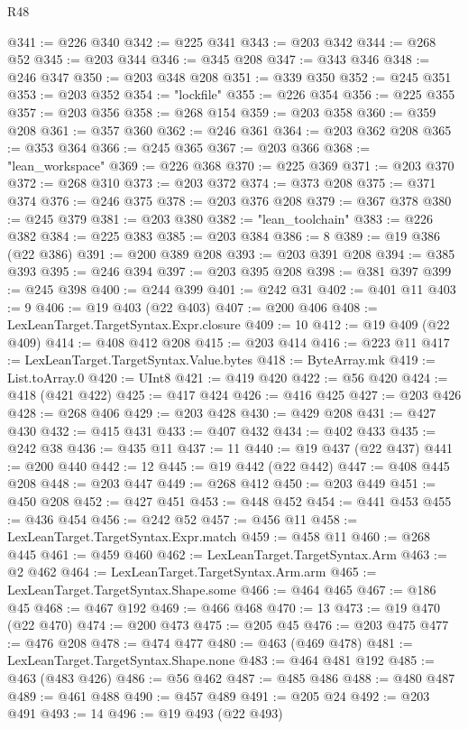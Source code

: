 \begin{lexlean}{R48}
\begin{coremodule}
@341 := @226 @340
@342 := @225 @341
@343 := @203 @342
@344 := @268 @52
@345 := @203 @344
@346 := @345 @208
@347 := @343 @346
@348 := @246 @347
@350 := @203 @348 @208
@351 := @339 @350
@352 := @245 @351
@353 := @203 @352
@354 := "lockfile"
@355 := @226 @354
@356 := @225 @355
@357 := @203 @356
@358 := @268 @154
@359 := @203 @358
@360 := @359 @208
@361 := @357 @360
@362 := @246 @361
@364 := @203 @362 @208
@365 := @353 @364
@366 := @245 @365
@367 := @203 @366
@368 := "lean_workspace"
@369 := @226 @368
@370 := @225 @369
@371 := @203 @370
@372 := @268 @310
@373 := @203 @372
@374 := @373 @208
@375 := @371 @374
@376 := @246 @375
@378 := @203 @376 @208
@379 := @367 @378
@380 := @245 @379
@381 := @203 @380
@382 := "lean_toolchain"
@383 := @226 @382
@384 := @225 @383
@385 := @203 @384
@386 := 8
@389 := @19 @386 (@22 @386)
@391 := @200 @389 @208
@393 := @203 @391 @208
@394 := @385 @393
@395 := @246 @394
@397 := @203 @395 @208
@398 := @381 @397
@399 := @245 @398
@400 := @244 @399
@401 := @242 @31
@402 := @401 @11
@403 := 9
@406 := @19 @403 (@22 @403)
@407 := @200 @406
@408 := LexLeanTarget.TargetSyntax.Expr.closure
@409 := 10
@412 := @19 @409 (@22 @409)
@414 := @408 @412 @208
@415 := @203 @414
@416 := @223 @11
@417 := LexLeanTarget.TargetSyntax.Value.bytes
@418 := ByteArray.mk
@419 := List.toArray.{0}
@420 := UInt8
@421 := @419 @420
@422 := @56 @420
@424 := @418 (@421 @422)
@425 := @417 @424
@426 := @416 @425
@427 := @203 @426
@428 := @268 @406
@429 := @203 @428
@430 := @429 @208
@431 := @427 @430
@432 := @415 @431
@433 := @407 @432
@434 := @402 @433
@435 := @242 @38
@436 := @435 @11
@437 := 11
@440 := @19 @437 (@22 @437)
@441 := @200 @440
@442 := 12
@445 := @19 @442 (@22 @442)
@447 := @408 @445 @208
@448 := @203 @447
@449 := @268 @412
@450 := @203 @449
@451 := @450 @208
@452 := @427 @451
@453 := @448 @452
@454 := @441 @453
@455 := @436 @454
@456 := @242 @52
@457 := @456 @11
@458 := LexLeanTarget.TargetSyntax.Expr.match
@459 := @458 @11
@460 := @268 @445
@461 := @459 @460
@462 := LexLeanTarget.TargetSyntax.Arm
@463 := @2 @462
@464 := LexLeanTarget.TargetSyntax.Arm.arm
@465 := LexLeanTarget.TargetSyntax.Shape.some
@466 := @464 @465
@467 := @186 @45
@468 := @467 @192
@469 := @466 @468
@470 := 13
@473 := @19 @470 (@22 @470)
@474 := @200 @473
@475 := @205 @45
@476 := @203 @475
@477 := @476 @208
@478 := @474 @477
@480 := @463 (@469 @478)
@481 := LexLeanTarget.TargetSyntax.Shape.none
@483 := @464 @481 @192
@485 := @463 (@483 @426)
@486 := @56 @462
@487 := @485 @486
@488 := @480 @487
@489 := @461 @488
@490 := @457 @489
@491 := @205 @24
@492 := @203 @491
@493 := 14
@496 := @19 @493 (@22 @493)

\end{coremodule}
\end{lexlean}
